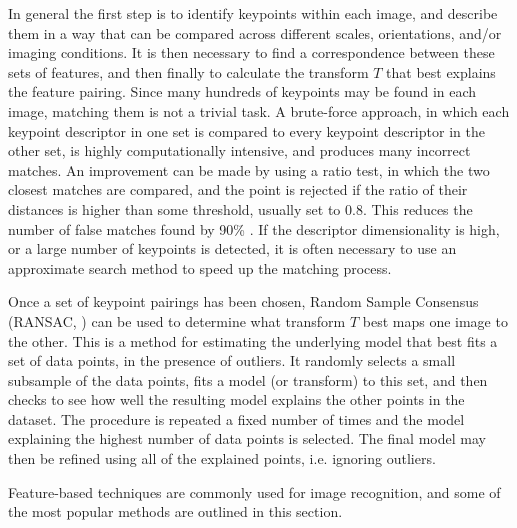 \documentclass{report}
\begin{document}
In general the first step is to identify keypoints within each image, and describe them in a way that can be compared across different scales, orientations, and/or imaging conditions. It is then necessary to find a correspondence between these sets of features, and then finally to calculate the transform $T$ that best explains the feature pairing. Since many hundreds of keypoints may be found in each image, matching them is not a trivial task. A brute-force approach, in which each keypoint descriptor in one set is compared to every keypoint descriptor in the other set, is highly computationally intensive, and produces many incorrect matches. An improvement can be made by using a ratio test, in which the two closest matches are compared, and the point is rejected if the ratio of their distances is higher than some threshold, usually set to 0.8. This reduces the number of false matches found by 90\% \citep{lowe2004distinctive}. If the descriptor dimensionality is high, or a large number of keypoints is detected, it is often necessary to use an approximate search method to speed up the matching process.

Once a set of keypoint pairings has been chosen, Random Sample Consensus (RANSAC, \cite{fischler1981random}) can be used to determine what transform $T$ best maps one image to the other. This is a method for estimating the underlying model that best fits a set of data points, in the presence of outliers. It randomly selects a small subsample of the data points, fits a model (or transform) to this set, and then checks to see how well the resulting model explains the other points in the dataset. The procedure is repeated a fixed number of times and the model explaining the highest number of data points is selected. The final model may then be refined using all of the explained points, i.e. ignoring outliers.

Feature-based techniques are commonly used for image recognition, and some of the most popular methods are outlined in this section.
\end{document}
